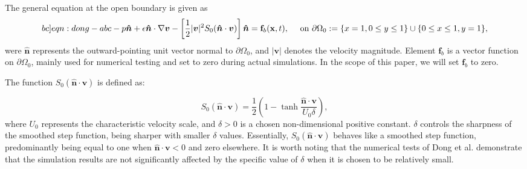 \documentclass{article}
\numberwithin{equation}{section}
\begin{document}
The general equation at the open boundary is given  as
\begin{equation}\label[bc]{eqn:dong-abc}
-p \boldsymbol{\hat{n}}+\epsilon \boldsymbol{\hat{n}} \cdot \nabla \boldsymbol{v}-\left[\frac{1}{2}|\boldsymbol{v}|^2 S_0(\boldsymbol{\hat{n}} \cdot \boldsymbol{v})\right] \boldsymbol{\hat{n}}=\mathbf{f}_b(\mathbf{x}, t), \quad \text { on } \partial \Omega_0:=\{x=1,0\leq y\leq 1\}\cup \{ 0\leq x \leq 1, y=1\},
\end{equation}
were $\boldsymbol{\hat{n}}$ represents the outward-pointing unit vector normal to $\partial \Omega_0$, and $|\boldsymbol{v}|$ denotes the velocity magnitude. Element $\mathbf{f}_b$ is a vector function on $\partial \Omega_0$, mainly used for numerical testing and set to zero during actual simulations. In the scope of this paper, we will set $\mathbf{f}_b$ to zero. 

The function $S_0(\boldsymbol{\hat{n}} \cdot \boldsymbol{v})$ is defined as:

\begin{equation}
S_0(\boldsymbol{\hat{n}} \cdot \boldsymbol{v})=\frac{1}{2}\left(1-\tanh \frac{\boldsymbol{\hat{n}} \cdot \boldsymbol{v}}{U_0 \delta}\right),
\end{equation}
where $U_0$ represents the characteristic velocity scale, and $\delta>0$ is a chosen non-dimensional positive constant. $\delta$ controls the sharpness of the smoothed step function, being sharper with smaller $\delta$ values. Essentially, $S_0(\boldsymbol{\hat{n}} \cdot \boldsymbol{v})$ behaves like a smoothed step function, predominantly being equal to one when $\boldsymbol{\hat{n}} \cdot \boldsymbol{v}<0$ and zero elsewhere. It is worth noting that the numerical tests of Dong et al. demonstrate that the simulation results are not significantly affected by the specific value of $\delta$ when it is chosen to be relatively small. 
\end{document}
